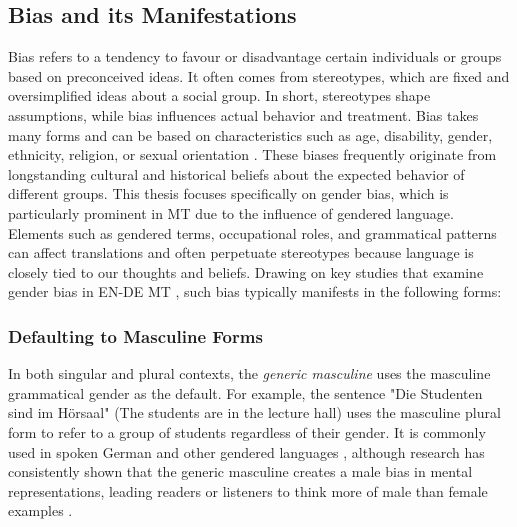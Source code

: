 \subsection{Bias and its Manifestations}
\label{subsection:manifestations_of_gb}
    Bias refers to a tendency to favour or disadvantage certain individuals or groups based on preconceived ideas. It often comes from stereotypes, which are fixed and oversimplified ideas about a social group. In short, stereotypes shape assumptions, while bias influences actual behavior and treatment. Bias takes many forms and can be based on characteristics such as age, disability, gender, ethnicity, religion, or sexual orientation \parencite{ullmannGenderBiasMachine2022}. These biases frequently originate from longstanding cultural and historical beliefs about the expected behavior of different groups. This thesis focuses specifically on gender bias, which is particularly prominent in MT due to the influence of gendered language. Elements such as gendered terms, occupational roles, and grammatical patterns can affect translations and often perpetuate stereotypes because language is closely tied to our thoughts and beliefs. Drawing on key studies that examine gender bias in EN-DE MT \parencite{ullmannGenderBiasMachine2022,rescignoGenderBiasMachine2023,lardelliBuildingBridgesDataset2024,kapplAreAllSpanish2025}, such bias typically manifests in the following forms:

    \subsubsection{Defaulting to Masculine Forms}
        In both singular and plural contexts, the \textit{generic masculine} uses the masculine grammatical gender as the default.
        For example, the sentence "Die Studenten sind im Hörsaal" (The students are in the lecture hall) uses the masculine plural form to refer to a group of students regardless of their gender. It is commonly used in spoken German and other gendered languages \parencite{lardelliBuildingBridgesDataset2024,schmitzGermanAllProfessors2022}, although research has consistently shown that the generic masculine creates a male bias in mental representations, leading readers or listeners to think more of male than female examples \parencite{sczesnyCanGenderFairLanguage2016}. 

